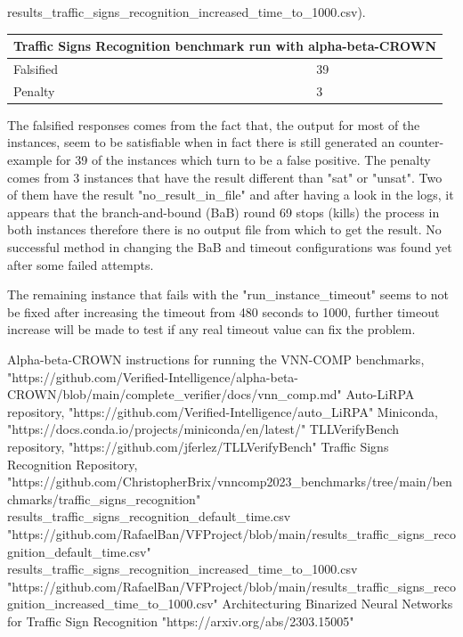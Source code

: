 \documentclass[12pt,a4paper]{report}
\begin{document}
results\_traffic\_signs\_recognition\_increased\_time\_to\_1000.csv\cite{traffic_signs_recognition_second_solution}).\\
\vspace{8pt}
\begin{tabular}{ |p{3cm}|p{3cm}|  }
 \hline
 \multicolumn{2}{|c|}{Traffic Signs Recognition benchmark run with alpha-beta-CROWN} \\
 \hline
 Falsified& 39\\
 \hline
 Penalty   & 3\\
 \hline
\end{tabular}
\vspace{10pt}

The falsified responses comes from the fact that, the output for most of the instances, seem to be satisfiable when in fact there is still generated an counter-example for 39 of the instances which turn to be a false positive. The penalty comes from 3 instances that have the result different than "sat" or "unsat". Two of them have the result "no\_result\_in\_file" and after having a look in the logs, it appears that the branch-and-bound (BaB) round 69 stops (kills) the process in both instances therefore there is no output file from which to get the result. No successful method in changing the BaB and timeout configurations was found yet after some failed attempts.

The remaining instance that fails with the "run\_instance\_timeout" seems to not be fixed after increasing the timeout from 480 seconds to 1000, further timeout increase will be made to test if any real timeout value can fix the problem.
\begin{thebibliography}{1}
 Alpha-beta-CROWN instructions for running the VNN-COMP benchmarks, "https://github.com/Verified-Intelligence/alpha-beta-CROWN/blob/main/complete\_verifier/docs/vnn\_comp.md"
 Auto-LiRPA repository, "https://github.com/Verified-Intelligence/auto\_LiRPA"
 Miniconda, "https://docs.conda.io/projects/miniconda/en/latest/"
 TLLVerifyBench repository, "https://github.com/jferlez/TLLVerifyBench"
 Traffic Signs Recognition Repository, "https://github.com/ChristopherBrix/vnncomp2023\_benchmarks/tree/main/benchmarks/traffic\_signs\_recognition"
 results\_traffic\_signs\_recognition\_default\_time.csv
"https://github.com/RafaelBan/VFProject/blob/main/results\_traffic\_signs\_recognition\_default\_time.csv"
 results\_traffic\_signs\_recognition\_increased\_time\_to\_1000.csv
"https://github.com/RafaelBan/VFProject/blob/main/results\_traffic\_signs\_recognition\_increased\_time\_to\_1000.csv"
Architecturing Binarized Neural Networks for Traffic Sign Recognition
"https://arxiv.org/abs/2303.15005"
\end{thebibliography}
\end{document}
